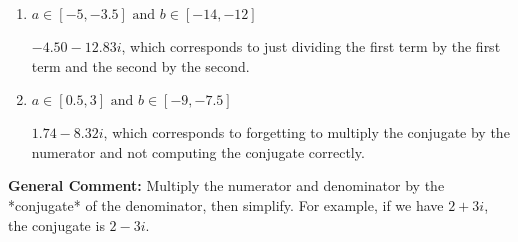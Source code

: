 \documentclass{extbook}[14pt]
\begin{document}
\begin{enumerate}
{\begin{enumerate}[label=\Alph*.]
 $-750.00  - 4.00 i$, which corresponds to forgetting to multiply the conjugate by the numerator and using a plus instead of a minus in the denominator.
\item \( a \in [-5, -3.5] \text{ and } b \in [-14, -12] \)

 $-4.50  - 12.83 i$, which corresponds to just dividing the first term by the first term and the second by the second.
\item \( a \in [0.5, 3] \text{ and } b \in [-9, -7.5] \)

 $1.74  - 8.32 i$, which corresponds to forgetting to multiply the conjugate by the numerator and not computing the conjugate correctly.
\end{enumerate}

\textbf{General Comment:} Multiply the numerator and denominator by the *conjugate* of the denominator, then simplify. For example, if we have $2+3i$, the conjugate is $2-3i$.
}
\end{enumerate}
\end{document}
